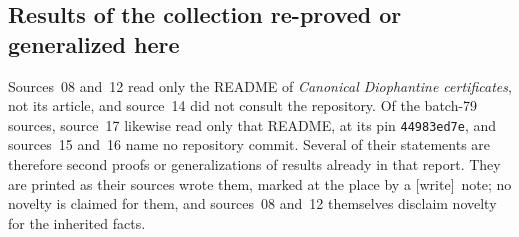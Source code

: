 \documentclass[11pt,letterpaper]{article}
\theoremstyle{definition}
\theoremstyle{remark}
\newcommand{\wtag}{\textup{[write]}}
\begin{document}
\subsection{Results of the collection re-proved or generalized here}\label{qoc:sec:reproofs}

Sources~08 and~12 read only the README of \emph{Canonical Diophantine certificates}, not its article, and source~14 did not consult the repository. Of the batch-79 sources, source~17 likewise read only that README, at its pin \texttt{44983ed7e}, and sources~15 and~16 name no repository commit. Several of their statements are therefore second proofs or generalizations of results already in that report. They are printed as their sources wrote them, marked at the place by a \wtag\ note; no novelty is claimed for them, and sources~08 and~12 themselves disclaim novelty for the inherited facts.
\end{document}
